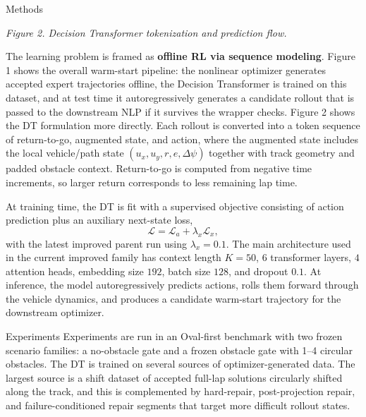 \documentclass[final]{beamer}
\newlength{\colwidth}
\begin{document}
\begin{frame}[t]
\begin{columns}[t]
\begin{column}{\colwidth}
\begin{block}{Methods}
\begin{center}
\end{center}

\begin{center}
\scriptsize\textit{Figure 2. Decision Transformer tokenization and prediction flow.}
\end{center}

The learning problem is framed as \textbf{offline RL via sequence modeling}. Figure 1 shows the overall warm-start pipeline: the nonlinear optimizer generates accepted expert trajectories offline, the Decision Transformer is trained on this dataset, and at test time it autoregressively generates a candidate rollout that is passed to the downstream NLP if it survives the wrapper checks. Figure 2 shows the DT formulation more directly. Each rollout is converted into a token sequence of return-to-go, augmented state, and action, where the augmented state includes the local vehicle/path state $(u_x,u_y,r,e,\Delta\psi)$ together with track geometry and padded obstacle context. Return-to-go is computed from negative time increments, so larger return corresponds to less remaining lap time.

At training time, the DT is fit with a supervised objective consisting of action prediction plus an auxiliary next-state loss,
\[
\mathcal{L} = \mathcal{L}_{a} + \lambda_x \mathcal{L}_{x},
\]
with the latest improved parent run using $\lambda_x=0.1$. The main architecture used in the current improved family has context length $K=50$, $6$ transformer layers, $4$ attention heads, embedding size $192$, batch size $128$, and dropout $0.1$. At inference, the model autoregressively predicts actions, rolls them forward through the vehicle dynamics, and produces a candidate warm-start trajectory for the downstream optimizer.
\end{block}

\begin{block}{Experiments}
Experiments are run in an Oval-first benchmark with two frozen scenario families: a no-obstacle gate and a frozen obstacle gate with 1--4 circular obstacles. The DT is trained on several sources of optimizer-generated data. The largest source is a shift dataset of accepted full-lap solutions circularly shifted along the track, and this is complemented by hard-repair, post-projection repair, and failure-conditioned repair segments that target more difficult rollout states.


\end{block}
\end{column}
\end{columns}
\end{frame}
\end{document}

